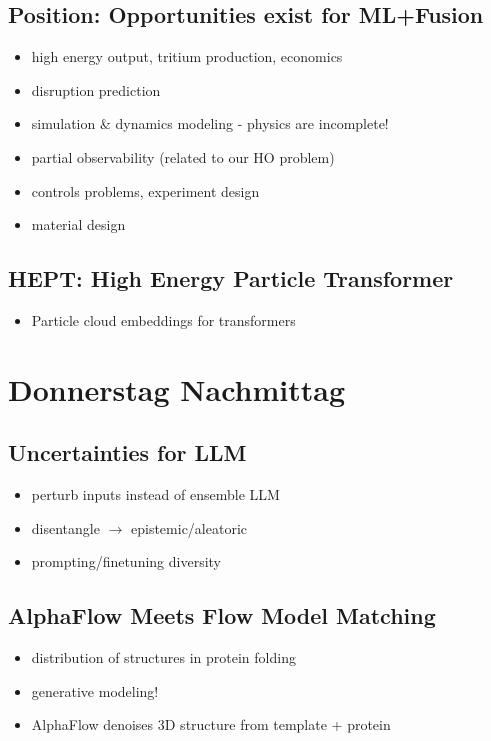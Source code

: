 \documentclass[a4paper]{article}
\begin{document}
\subsection*{Position: Opportunities exist for ML+Fusion}
\begin{itemize}
    \item high energy output, tritium production, economics
    \item disruption prediction
    \item simulation \& dynamics modeling - physics are incomplete!
    \item partial observability (related to our HO problem)
    \item controls problems, experiment design
    \item material design
\end{itemize}
\subsection*{HEPT: High Energy Particle Transformer}
\begin{itemize}
    \item Particle cloud embeddings for transformers
\end{itemize}
\section*{Donnerstag Nachmittag}
\subsection*{Uncertainties for LLM}
\begin{itemize}
    \item perturb inputs instead of ensemble LLM
    \item disentangle $\rightarrow$ epistemic/aleatoric
    \item prompting/finetuning diversity
\end{itemize}
\subsection*{AlphaFlow Meets Flow Model Matching}
\begin{itemize}
    \item distribution of structures in protein folding
    \item generative modeling!
    \item AlphaFlow denoises 3D structure from template + protein
\end{itemize}
\end{document}
